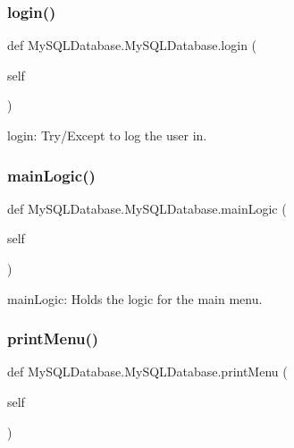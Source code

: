 \subsubsection{\texorpdfstring{login()}{login()}}
{\footnotesize\ttfamily def My\+S\+Q\+L\+Database.\+My\+S\+Q\+L\+Database.\+login (\begin{DoxyParamCaption}\item[{}]{self }\end{DoxyParamCaption})}

\begin{DoxyVerb}login: Try/Except to log the user in. \end{DoxyVerb}
 \hypertarget{class_my_s_q_l_database_1_1_my_s_q_l_database_a0fbc0754105eb3364e880b20c384a8dd}{}\label{class_my_s_q_l_database_1_1_my_s_q_l_database_a0fbc0754105eb3364e880b20c384a8dd} 
\subsubsection{\texorpdfstring{main\+Logic()}{mainLogic()}}
{\footnotesize\ttfamily def My\+S\+Q\+L\+Database.\+My\+S\+Q\+L\+Database.\+main\+Logic (\begin{DoxyParamCaption}\item[{}]{self }\end{DoxyParamCaption})}

\begin{DoxyVerb}mainLogic: Holds the logic for the main menu. \end{DoxyVerb}
 \hypertarget{class_my_s_q_l_database_1_1_my_s_q_l_database_a3350d0f83d2d015b46bba5c0358a540d}{}\label{class_my_s_q_l_database_1_1_my_s_q_l_database_a3350d0f83d2d015b46bba5c0358a540d} 
\subsubsection{\texorpdfstring{print\+Menu()}{printMenu()}}
{\footnotesize\ttfamily def My\+S\+Q\+L\+Database.\+My\+S\+Q\+L\+Database.\+print\+Menu (\begin{DoxyParamCaption}\item[{}]{self }\end{DoxyParamCaption})}

